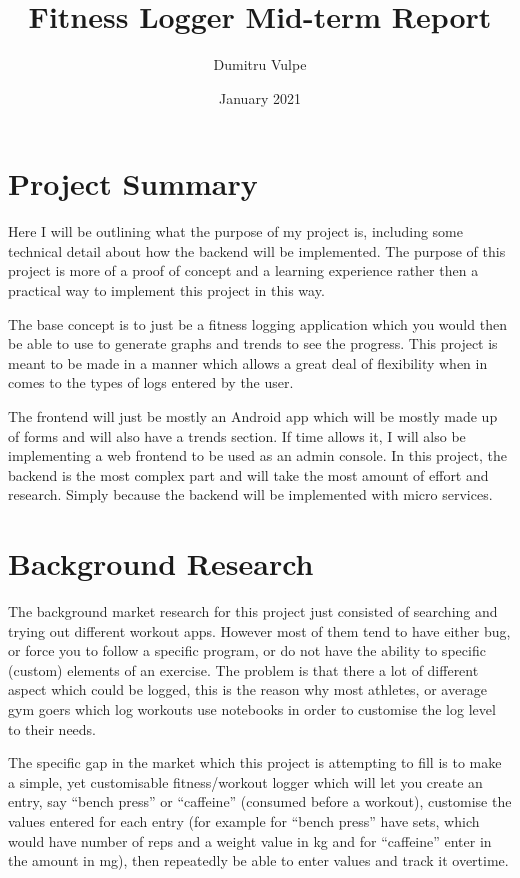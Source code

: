 \documentclass[11pt]{article}
\title{Fitness Logger Mid-term Report}
\author{Dumitru Vulpe}
\date{January 2021}
\begin{document}
\maketitle
\tableofcontents
\newpage

\section{Project Summary}

Here I will be outlining what the purpose of my project is, including some technical detail about how the backend will be implemented. The purpose of this project is more of a proof of concept and a learning experience rather then a practical way to implement this project in this way. \par

The base concept is to just be a fitness logging application which you would then be able to use to generate graphs and trends to see the progress. This project is meant to be made in a manner which allows a great deal of flexibility when in comes to the types of logs entered by the user. \par

The frontend will just be mostly an Android app which will be mostly made up of forms and will also have a trends section. If time allows it, I will also be implementing a web frontend to be used as an admin console. In this project, the backend is the most complex part and will take the most amount of effort and research. Simply because the backend will be implemented with micro services. \par

\section{Background Research}

The background market research for this project just consisted of searching and trying out different workout apps. However most of them tend to have either bug, or force you to follow a specific program, or do not have the ability to specific (custom) elements of an exercise. The problem is that there a lot of different aspect which could be logged, this is the reason why most athletes, or average gym goers which log workouts use notebooks in order to customise the log level to their needs.  \par

The specific gap in the market which this project is attempting to fill is to make a simple, yet customisable fitness/workout logger which will let you create an entry, say ``bench press'' or ``caffeine'' (consumed before a workout), customise the values entered for each entry (for example for ``bench press'' have sets, which would have number of reps and a weight value in kg and for ``caffeine'' enter in the amount in mg), then repeatedly be able to enter values and track it overtime. \par
\end{document}
